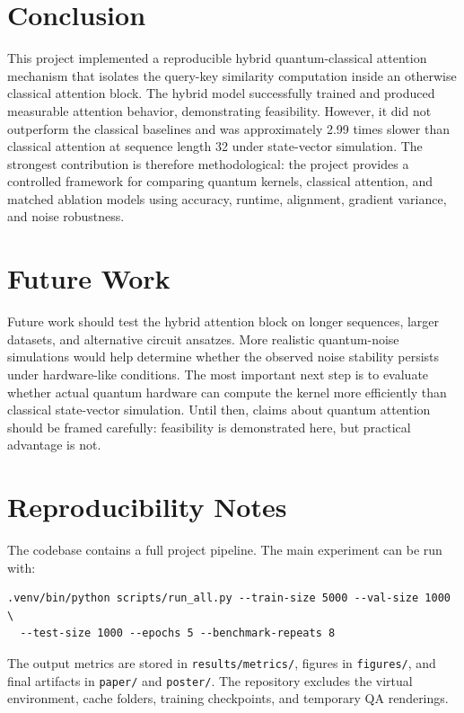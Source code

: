 \documentclass[11pt]{article}
\begin{document}
\section{Conclusion}
This project implemented a reproducible hybrid quantum-classical attention mechanism that isolates the query-key similarity computation inside an otherwise classical attention block. The hybrid model successfully trained and produced measurable attention behavior, demonstrating feasibility. However, it did not outperform the classical baselines and was approximately 2.99 times slower than classical attention at sequence length 32 under state-vector simulation. The strongest contribution is therefore methodological: the project provides a controlled framework for comparing quantum kernels, classical attention, and matched ablation models using accuracy, runtime, alignment, gradient variance, and noise robustness.

\section{Future Work}
Future work should test the hybrid attention block on longer sequences, larger datasets, and alternative circuit ansatzes. More realistic quantum-noise simulations would help determine whether the observed noise stability persists under hardware-like conditions. The most important next step is to evaluate whether actual quantum hardware can compute the kernel more efficiently than classical state-vector simulation. Until then, claims about quantum attention should be framed carefully: feasibility is demonstrated here, but practical advantage is not.

\appendix
\section{Reproducibility Notes}
The codebase contains a full project pipeline. The main experiment can be run with:
\begin{verbatim}
.venv/bin/python scripts/run_all.py --train-size 5000 --val-size 1000 \
  --test-size 1000 --epochs 5 --benchmark-repeats 8
\end{verbatim}
The output metrics are stored in \texttt{results/metrics/}, figures in \texttt{figures/}, and final artifacts in \texttt{paper/} and \texttt{poster/}. The repository excludes the virtual environment, cache folders, training checkpoints, and temporary QA renderings.
\end{document}
